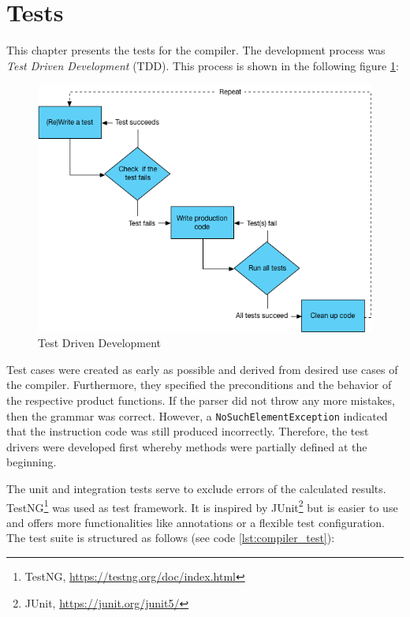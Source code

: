 \newpage
\section{Tests}
\label{sec:tests}
This chapter presents the tests for the compiler. The development process was \emph{Test Driven Development} (TDD). This process is shown in the following figure \ref{fig:tdd}:

\begin{figure}[bth]
	\centering
	\includegraphics[scale=0.6]{./img/tdd}
	\caption[Test Driven Development]{Test Driven Development}
	\label{fig:tdd}
\end{figure}
\noindent

Test cases were created as early as possible and derived from desired use cases of the compiler. Furthermore, they specified the preconditions and the behavior of the respective product functions. If the parser did not throw any more mistakes, then the grammar was correct. However, a \texttt{NoSuchElementException} indicated that the instruction code was still produced incorrectly. Therefore, the test drivers were developed first whereby methods were partially defined at the beginning.

The unit and integration tests serve to exclude errors of the calculated results. TestNG\footnote{TestNG, \url{https://testng.org/doc/index.html}} was used as test framework. It is inspired by JUnit\footnote{JUnit, \url{https://junit.org/junit5/}} but is easier to use and offers more functionalities like annotations or a flexible test configuration. The test suite is structured as follows (see code \ref{lst:compiler_test}):

